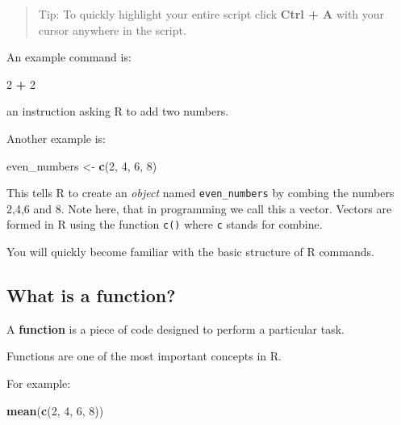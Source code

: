 \documentclass[
]{book}
\newenvironment{Shaded}{\begin{snugshade}}{\end{snugshade}}
\newcommand{\DecValTok}[1]{\textcolor[rgb]{0.00,0.00,0.81}{#1}}
\newcommand{\FunctionTok}[1]{\textcolor[rgb]{0.13,0.29,0.53}{\textbf{#1}}}
\newcommand{\NormalTok}[1]{#1}
\newcommand{\OtherTok}[1]{\textcolor[rgb]{0.56,0.35,0.01}{#1}}
\newcommand{\SpecialCharTok}[1]{\textcolor[rgb]{0.81,0.36,0.00}{\textbf{#1}}}
\begin{document}
\begin{quote}
Tip: To quickly highlight your entire script click \textbf{Ctrl + A} with your cursor anywhere in the script.
\end{quote}

An example command is:

\begin{Shaded}
\begin{Highlighting}[]
\DecValTok{2} \SpecialCharTok{+} \DecValTok{2}
\end{Highlighting}
\end{Shaded}

an instruction asking R to add two numbers.

Another example is:

\begin{Shaded}
\begin{Highlighting}[]
\NormalTok{even\_numbers }\OtherTok{\textless{}{-}} \FunctionTok{c}\NormalTok{(}\DecValTok{2}\NormalTok{, }\DecValTok{4}\NormalTok{, }\DecValTok{6}\NormalTok{, }\DecValTok{8}\NormalTok{)}
\end{Highlighting}
\end{Shaded}

This tells R to create an \emph{object} named \texttt{even\_numbers} by combing the numbers 2,4,6 and 8. Note here, that in programming we call this a vector. Vectors are formed in R using the function \texttt{c()} where \texttt{c} stands for combine.

You will quickly become familiar with the basic structure of R commands.

\subsection{What is a function?}\label{what-is-a-function}

A \textbf{function} is a piece of code designed to perform a particular task.

Functions are one of the most important concepts in R.

For example:

\begin{Shaded}
\begin{Highlighting}[]
\FunctionTok{mean}\NormalTok{(}\FunctionTok{c}\NormalTok{(}\DecValTok{2}\NormalTok{, }\DecValTok{4}\NormalTok{, }\DecValTok{6}\NormalTok{, }\DecValTok{8}\NormalTok{))}
\end{Highlighting}
\end{Shaded}
\end{document}
